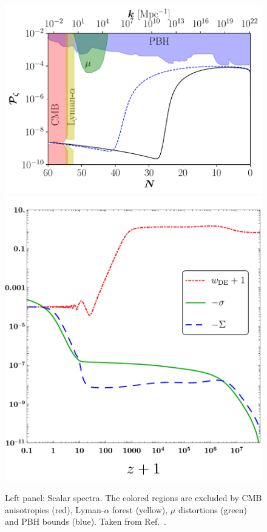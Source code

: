 \documentclass[a4paper,11pt]{article}
\begin{document}
\begin{enumerate}
\begin{figure}
	\centering
	\includegraphics[scale=0.55]{plots/spectrum.pdf}
	\includegraphics[scale=0.32]{plots/ltsigma.pdf}
	\caption{Left panel: Scalar spectra.  The colored regions are excluded by CMB anisotropies (red), Lyman-$\alpha$ forest (yellow), $\mu$ distortions (green) and PBH bounds (blue). Taken from Ref.~\cite{Almeida:2020kaq}.
}
\end{figure}
\end{enumerate}
\end{document}
